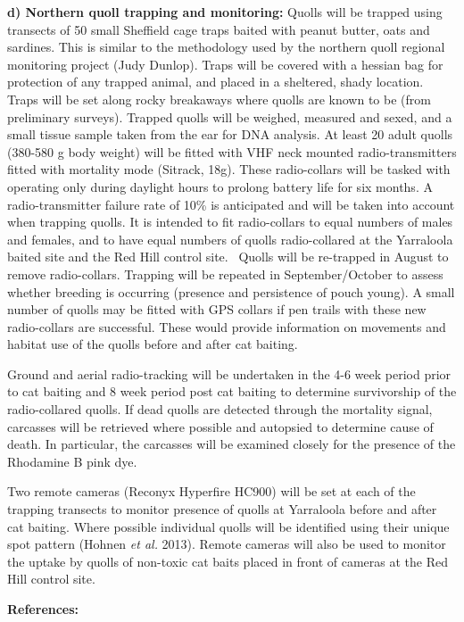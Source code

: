 \documentclass[version=last,
    paper=a4,                               %
    10pt,                                   %
    dvipsnames,
    oneside,                              %
    headings=openany,                       %
    open=any,
    BCOR=7mm,                               %
    DIV=15,     %
]{scrbook}
\begin{document}
\textbf{d) Northern quoll trapping and monitoring:} Quolls will be
trapped using transects of 50 small Sheffield cage traps baited with
peanut butter, oats and sardines. This is similar to the methodology
used by the northern quoll regional monitoring project (Judy Dunlop).
Traps will be covered with a hessian bag for protection of any trapped
animal, and placed in a sheltered, shady location. Traps will be set
along rocky breakaways where quolls are known to be (from preliminary
surveys). Trapped quolls will be weighed, measured and sexed, and a
small tissue sample taken from the ear for DNA analysis. At least 20
adult quolls (380-580 g body weight) will be fitted with VHF neck
mounted radio-transmitters fitted with mortality mode (Sitrack, 18g).
These radio-collars will be tasked with operating only during daylight
hours to prolong battery life for six months. A radio-transmitter
failure rate of 10\% is anticipated and will be taken into account when
trapping quolls. It is intended to fit radio-collars to equal numbers of
males and females, and to have equal numbers of quolls radio-collared at
the Yarraloola baited site and the Red Hill control site. ~Quolls will
be re-trapped in August to remove radio-collars. Trapping will be
repeated in September/October to assess whether breeding is occurring
(presence and persistence of pouch young). A small number of quolls may
be fitted with GPS collars if pen trails with these new radio-collars
are successful. These would provide information on movements and habitat
use of the quolls before and after cat baiting.

Ground and aerial radio-tracking will be undertaken in the 4-6 week
period prior to cat baiting and 8 week period post cat baiting to
determine survivorship of the radio-collared quolls. If dead quolls are
detected through the mortality signal, carcasses will be retrieved where
possible and autopsied to determine cause of death. In particular, the
carcasses will be examined closely for the presence of the Rhodamine B
pink dye.

Two remote cameras (Reconyx Hyperfire HC900) will be set at each of the
trapping transects to monitor presence of quolls at Yarraloola before
and after cat baiting. Where possible individual quolls will be
identified using their unique spot pattern (Hohnen \emph{et al.} 2013).
Remote cameras will also be used to monitor the uptake by quolls of
non-toxic cat baits placed in front of cameras at the Red Hill control
site.

\textbf{References:}
\end{document}
